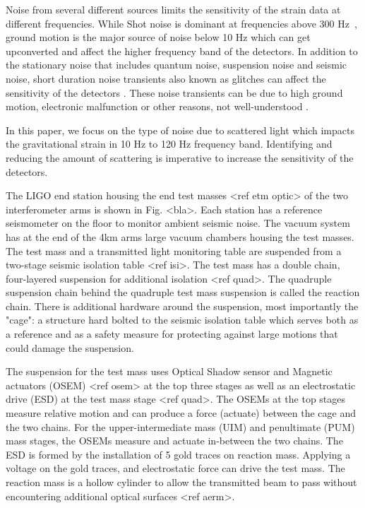 \documentclass[12pt]{iopart}
\begin{document}
Noise from several different sources limits the sensitivity of the strain data at different frequencies. 
While Shot noise is dominant at frequencies above 300 Hz~\cite{tjthesis}, ground motion is the major source of noise below 10 Hz which can get upconverted and affect the higher frequency band of the detectors. In addition to the stationary noise that includes quantum noise, suspension noise and seismic noise, short duration noise transients also known as glitches can affect the sensitivity of the detectors \cite{transientpaper}. These noise transients can be due to high ground motion, electronic malfunction or other reasons, not well-understood \cite{noisepaper,Cabero_2019}.

In this paper, we focus on the type of noise due to scattered light which impacts the gravitational strain in 10 Hz to 120 Hz frequency band.  Identifying and reducing the amount of scattering is imperative to increase the sensitivity of the detectors. 
 
The LIGO end station housing the end test masses <ref etm optic> of the two interferometer arms is shown in Fig. <bla>. Each station has a reference seismometer on the floor to monitor ambient seismic noise. The vacuum system has at the end of the 4km arms large vacuum chambers housing the test masses. The test mass and a transmitted light monitoring table are suspended from a two-stage seismic isolation table <ref isi>. The test mass has a double chain, four-layered suspension for additional isolation <ref quad>. The quadruple suspension chain behind the quadruple test mass suspension is called the reaction chain. There is additional hardware around the suspension, most importantly the "cage": a structure hard bolted to the seismic isolation table which serves both as a reference and as a safety measure for protecting against large motions that could damage the suspension.

The suspension for the test mass uses Optical Shadow sensor and Magnetic actuators (OSEM) <ref osem> at the top three stages as well as an electrostatic drive (ESD) at the test mass stage <ref quad>. The OSEMs at the top stages measure relative motion and can produce a force (actuate) between the cage and the two chains. For the upper-intermediate mass (UIM) and penultimate (PUM) mass stages, the OSEMs measure and actuate in-between the two chains. The ESD is formed by the installation of 5 gold traces on reaction mass. Applying a voltage on the gold traces, and electrostatic force can drive the test mass.  The reaction mass is a hollow cylinder to allow the transmitted beam to pass without encountering additional optical surfaces <ref aerm>.
\end{document}
